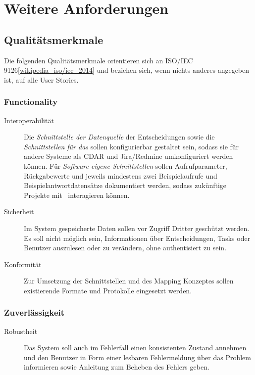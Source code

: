 \section{Weitere Anforderungen}

	\subsection{Qualitätsmerkmale}
		Die folgenden Qualitätsmerkmale orientieren sich an ISO/IEC 9126\ref{wikipedia_iso/iec_2014} und beziehen sich, wenn nichts anderes angegeben ist, auf alle User Stories.

		\subsubsection{Functionality}
		\begin{description}
			\item[Interoperabilität] Die \textit{Schnittstelle der Datenquelle} der Entscheidungen sowie die \textit{Schnittstellen für das \ppt} sollen konfigurierbar gestaltet sein, sodass sie für andere Systeme als CDAR und Jira/Redmine umkonfiguriert werden können. 
			Für \textit{Software eigene Schnittstellen} sollen Aufrufparameter, Rückgabewerte und jeweils mindestens zwei Beispielaufrufe und Beispielantwortdatensätze dokumentiert werden, sodass zukünftige Projekte mit \eeppi\ interagieren können.
			\item[Sicherheit] Im System gespeicherte Daten sollen vor Zugriff Dritter geschützt werden.
			Es soll nicht möglich sein, Informationen über Entscheidungen, Tasks oder Benutzer auszulesen oder zu verändern, 
			ohne authentisiert zu sein.
			\item[Konformität] Zur Umsetzung der Schnittstellen und des Mapping Konzeptes sollen existierende Formate und Protokolle eingesetzt werden.
		\end{description}
		
		
		\subsubsection{Zuverlässigkeit}
		\begin{description}
			\item[Robustheit] Das System soll auch im Fehlerfall einen konsistenten Zustand annehmen und den Benutzer in Form einer lesbaren Fehlermeldung über das Problem informieren sowie Anleitung zum Beheben des Fehlers geben.
		\end{description}
		

